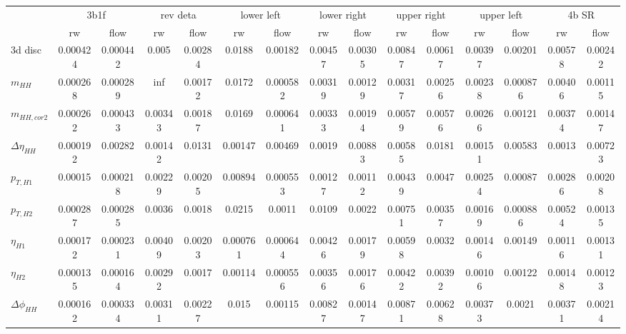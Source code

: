 \begin{table}
\centering\begin{adjustbox}{width=\columnwidth,center}
\label{tab:kl}
\begin{tabular}{lcccccccccccccc}
\toprule
{} & \multicolumn{2}{c}{3b1f} & \multicolumn{2}{c}{rev deta} & \multicolumn{2}{c}{lower left} & \multicolumn{2}{c}{lower right} & \multicolumn{2}{c}{upper right} & \multicolumn{2}{c}{upper left} & \multicolumn{2}{c}{4b SR} \\
{} &       rw &     flow &       rw &    flow &         rw &     flow &          rw &    flow &          rw &    flow &         rw &     flow &      rw &    flow \\
\midrule
3d disc            & 0.000424 & 0.000442 &    0.005 & 0.00284 &     0.0188 &  0.00182 &     0.00457 & 0.00305 &     0.00847 & 0.00617 &    0.00397 &  0.00201 & 0.00578 & 0.00242 \\
$m_{HH}$           & 0.000268 & 0.000289 &      inf & 0.00172 &     0.0172 & 0.000582 &     0.00319 & 0.00129 &     0.00317 & 0.00256 &    0.00238 & 0.000876 & 0.00406 & 0.00115 \\
$m_{HH,cor2}$      & 0.000262 & 0.000433 &  0.00343 & 0.00187 &     0.0169 & 0.000641 &     0.00333 & 0.00194 &     0.00579 & 0.00576 &    0.00266 &  0.00121 & 0.00374 & 0.00147 \\
$\Delta \eta_{HH}$ & 0.000192 &  0.00282 &  0.00142 &  0.0131 &    0.00147 &  0.00469 &      0.0019 & 0.00883 &     0.00585 &  0.0181 &    0.00151 &  0.00583 &  0.0013 & 0.00723 \\
$p_{T,H1}$         &  0.00015 & 0.000218 &  0.00229 & 0.00205 &    0.00894 & 0.000553 &     0.00127 & 0.00112 &     0.00439 &  0.0047 &    0.00254 &  0.00087 & 0.00286 & 0.00208 \\
$p_{T,H2}$         & 0.000287 & 0.000285 &   0.0036 &  0.0018 &     0.0215 &   0.0011 &      0.0109 &  0.0022 &     0.00751 & 0.00357 &    0.00169 & 0.000886 & 0.00524 & 0.00135 \\
$\eta_{H1}$        & 0.000172 & 0.000231 &  0.00409 & 0.00203 &   0.000761 & 0.000644 &     0.00426 & 0.00179 &     0.00598 &  0.0032 &    0.00146 &  0.00149 & 0.00116 & 0.00131 \\
$\eta_{H2}$        & 0.000135 & 0.000164 &  0.00292 &  0.0017 &    0.00114 & 0.000556 &     0.00356 & 0.00176 &     0.00422 & 0.00392 &    0.00106 &  0.00122 & 0.00148 & 0.00123 \\
$\Delta \phi_{HH}$ & 0.000162 & 0.000334 &  0.00311 & 0.00227 &      0.015 &  0.00115 &     0.00827 & 0.00147 &     0.00871 & 0.00628 &    0.00373 &   0.0021 & 0.00371 & 0.00214 \\

\end{tabular}
\end{adjustbox}
\end{table}
